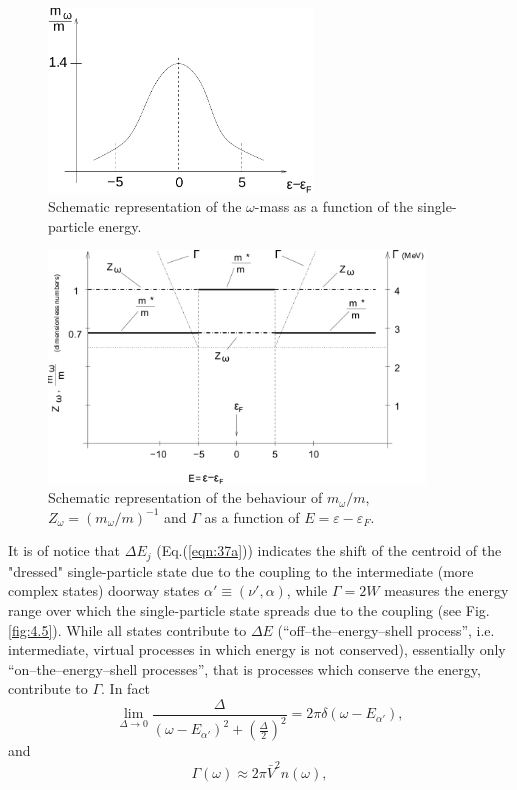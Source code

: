 \begin{figure}[h!]
\centerline {
\includegraphics*[width=7cm]{introduccion/figs/figintroD3}
}
\caption{Schematic representation of the $\omega$-mass as a function of the single-particle energy.}
\label{fig:4.3}
\end{figure}

\begin{figure}[h!]
\centerline {
\includegraphics*[width=10cm]{introduccion/figs/figintroD4}
}
\caption{Schematic representation of the behaviour of $m_{\omega}/m$, $Z_{\omega}=(m_{\omega}/m)^{-1}$ and $\Gamma$ as a function of $E = \varepsilon - \varepsilon_F$.}
\label{fig:4.4}
\end{figure}


It is of notice that $\Delta E_j$ (Eq.(\ref{eqn:37a})) indicates the shift  of the  centroid of the "dressed" single-particle state due to the coupling to the intermediate (more complex states) doorway states $\alpha' \equiv (\nu',\alpha)$, while $\Gamma = 2W$ measures the energy range over which the single-particle state spreads due to the coupling (see Fig.\ref{fig:4.5}). While all states contribute to $\Delta E$ (``off--the--energy--shell process'', i.e. intermediate, virtual processes in which energy is not conserved), essentially only ``on--the--energy--shell processes'', that is processes which conserve the energy, contribute to $\Gamma$. In fact
\begin{equation}
\nonumber
\lim_{\Delta \rightarrow 0} \frac{\Delta}{(\omega -E_{\alpha'})^2 + \left( \frac{\Delta}{2} \right)^2} = 2\pi\delta(\omega-E_{\alpha'}) ,
\end{equation}
and
\begin{equation}
\Gamma(\omega) \approx 2\pi \bar{V}^2 n(\omega) ,
\label{eqn:41}
\end{equation}

